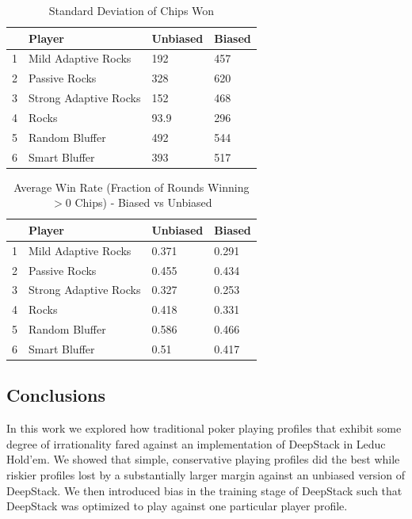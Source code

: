 \documentclass{article}
\begin{document}
\begin{table}
\centering
\begin{tabular}{rlll}
  \hline
 & Player & Unbiased & Biased \\ 
  \hline
1 & Mild Adaptive Rocks & 192 & 457 \\ 
  2 & Passive Rocks & 328 & 620 \\ 
  3 & Strong Adaptive Rocks & 152 & 468 \\ 
  4 & Rocks & 93.9 & 296 \\ 
  5 & Random Bluffer & 492 & 544 \\ 
  6 & Smart Bluffer & 393 & 517 \\ 
   \hline
\end{tabular}
\caption{Standard Deviation of Chips Won}
\label{table:sd_chips}
\end{table}


\begin{table}
\centering
\begin{tabular}{rlll}
  \hline
 & Player & Unbiased & Biased \\ 
  \hline
1 & Mild Adaptive Rocks & 0.371 & 0.291 \\ 
  2 & Passive Rocks & 0.455 & 0.434 \\ 
  3 & Strong Adaptive Rocks & 0.327 & 0.253 \\ 
  4 & Rocks & 0.418 & 0.331 \\ 
  5 & Random Bluffer & 0.586 & 0.466 \\ 
  6 & Smart Bluffer & 0.51 & 0.417 \\ 
   \hline
\end{tabular}
\caption{Average Win Rate (Fraction of Rounds Winning $> 0$ Chips) - Biased vs Unbiased}
\label{table:win_rate}
\end{table}

\subsection{Conclusions}

In this work we explored how traditional poker playing profiles that exhibit some degree of irrationality fared against an implementation of DeepStack in Leduc Hold'em. We showed that simple, conservative playing profiles did the best while riskier profiles lost by a substantially larger margin against an unbiased version of DeepStack. We then introduced bias in the training stage of DeepStack such that DeepStack was optimized to play against one particular player profile. 
\end{document}
